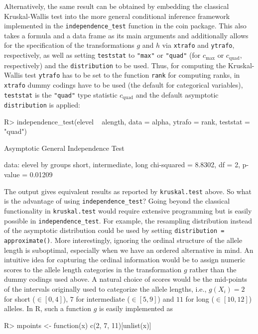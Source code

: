 \documentclass{article}
\newcommand{\Rpackage}[1]{{\normalfont\fontseries{b}\selectfont #1}}
\newcommand{\Rcmd}[1]{\texttt{#1}}
\newcommand{\RR}{\textsf{R}}
\newenvironment{Schunk}{}{}
\begin{document}
Alternatively, the same result can be obtained by embedding the classical Kruskal-Wallis
test into the more general conditional inference framework implemented in the
\Rcmd{independence\_test} function in the \Rpackage{coin} package. This also takes
a formula and a data frame as its main arguments and additionally allows for the
specification of the transformations $g$ and $h$ via 
\Rcmd{xtrafo} and \Rcmd{ytrafo}, respectively, as well as setting \Rcmd{teststat}
to \Rcmd{"max"} or \Rcmd{"quad"} (for $c_\text{max}$ or $c_\text{quad}$, respectively)
and the \Rcmd{distribution} to be used. Thus, for computing the Kruskal-Wallis test
\Rcmd{ytrafo} has to be set to the function \Rcmd{rank} for computing ranks, in \Rcmd{xtrafo}
dummy codings have to be used (the default for categorical variables), \Rcmd{teststat}
is the \Rcmd{"quad"} type statistic $c_\text{quad}$ and the default asymptotic
\Rcmd{distribution} is applied:
\begin{Schunk}
\begin{Sinput}
R> independence_test(elevel ~ alength, data = alpha, 
       ytrafo = rank, teststat = "quad")
\end{Sinput}
\begin{Soutput}
	Asymptotic General Independence Test

data:  elevel by groups short, intermediate, long 
chi-squared = 8.8302, df = 2, p-value = 0.01209
\end{Soutput}
\end{Schunk}
The output gives equivalent results as reported by \Rcmd{kruskal.test} above.
So what is the advantage of using \Rcmd{independence\_test}?
Going beyond the classical functionality in \Rcmd{kruskal.test}
would require extensive programming but is easily possible in
\Rcmd{independence\_test}. For example, the resampling distribution instead of
the asymptotic distribution could be used by setting \Rcmd{distribution = approximate()}.
More interestingly, ignoring the ordinal structure of the allele length is
suboptimal, especially when we have an ordered alternative in mind. 
An intuitive idea for capturing the ordinal information would be to
assign numeric scores to the allele length categories in the transformation
$g$ rather than the dummy codings used above. A natural 
choice of scores would be the mid-points of the intervals originally 
used to categorize the allele lengths, i.e., $g(X_i) = 2$ for short
($\in [0, 4]$), $7$ for intermediate ($\in [5, 9]$) and $11$ for
long ($\in [10, 12]$) alleles. In \RR{}, such a function $g$ is easily
implemented as
\begin{Schunk}
\begin{Sinput}
R> mpoints <- function(x) c(2, 7, 11)[unlist(x)]
\end{Sinput}
\end{Schunk}
\end{document}
